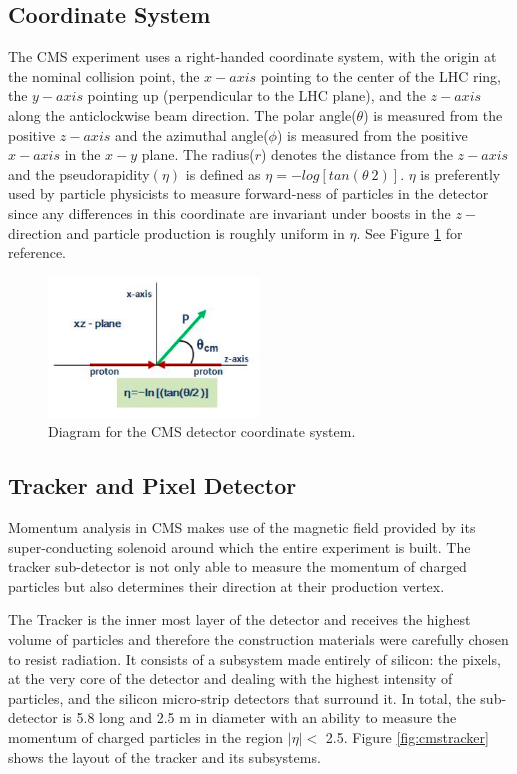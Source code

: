 \subsection{Coordinate System}

 The CMS experiment uses a right-handed coordinate system, with the origin at the nominal collision point, the $x-axis$ pointing to the center of the LHC ring, the $y-axis$ pointing up (perpendicular to the LHC plane), and the $z-axis$ along the anticlockwise beam direction. The polar angle($\theta$) is measured from the positive $z-axis$ and the azimuthal angle($\phi$) is measured from the positive $x-axis$ in the $x-y$ plane. The radius($r$) denotes the distance from the $z-axis$ and the pseudorapidity$(\eta)$ is defined as $\eta=-log[tan(\theta \ 2)]$. $\eta$ is preferently used by particle physicists to measure forward-ness of particles in the detector since any differences in this coordinate are invariant under boosts in the $z-$direction and particle production is roughly uniform in $\eta$. See Figure \ref{fig:cmscor} for reference.

  \begin{figure}[H]
 	\centering
 	\includegraphics[width=0.5\textwidth]{figures/corsym.png}
 	\singlespace
 	\caption{Diagram for the CMS detector coordinate system.}
 	\label{fig:cmscor}
 \end{figure}

 \subsection{Tracker and Pixel Detector}
 Momentum analysis in CMS makes use of the magnetic field provided by its super-conducting solenoid around which the entire experiment is built. The tracker sub-detector is not only able to measure the momentum of charged particles but also determines their direction at their production vertex.

 The Tracker is the inner most layer of the detector and receives the highest volume of particles and therefore the construction materials were carefully chosen to resist radiation. It consists of a subsystem made entirely of silicon: the pixels, at the very core of the detector and dealing with the highest intensity of particles, and the silicon micro-strip detectors that surround it. In total, the sub-detector is 5.8 long and 2.5 m in diameter with an ability to measure the momentum of charged particles in the region $|\eta|<$ 2.5. Figure \ref{fig:cmstracker} shows the layout of the tracker and its subsystems.

